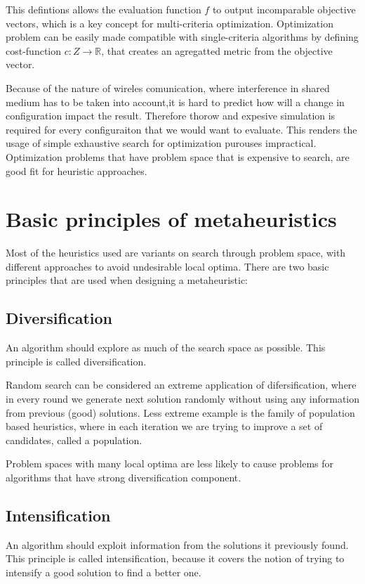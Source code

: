 \documentclass[12pt,oneside]{fithesis2}
\begin{document}
This defintions allows the evaluation function $f$ to output incomparable objective vectors, which is a key concept for multi-criteria optimization. Optimization problem can be easily made compatible with single-criteria algorithms by defining cost-function $c:Z \to \mathbb{R}$, that creates an agregatted metric from the objective vector.

Because of the nature of wireles comunication, where interference in shared medium has to be taken into account,it is hard to predict how will a change in configuration impact the result. Therefore thorow and expesive simulation is required for every configuraiton that we would want to evaluate. This renders the usage of simple exhaustive search for optimization purouses impractical. Optimization problems that have problem space that is expensive to search, are good fit for heuristic approaches\cite{talbi2009metaheuristics}. 

\section{Basic principles of metaheuristics}

Most of the heuristics used are variants on search through problem space, with different approaches to avoid undesirable local optima.
There are two basic principles that are used when designing a metaheuristic\cite{talbi2009metaheuristics}:

\subsection{Diversification}
An algorithm should explore as much of the search space as possible. This principle is called diversification.

Random search can be considered an extreme application of difersification, where in every round we generate next solution randomly without using any information from previous (good) solutions. Less extreme example is the family of population based heuristics, where in each iteration we are trying to improve a set of candidates, called a population.

Problem spaces with many local optima are less likely to cause problems for algorithms that have strong diversification component.

\subsection{Intensification} 
An algorithm should exploit information from the solutions it previously found. This principle is called intensification, because it covers the notion of trying to intensify a good solution to find a better one.
\end{document}
